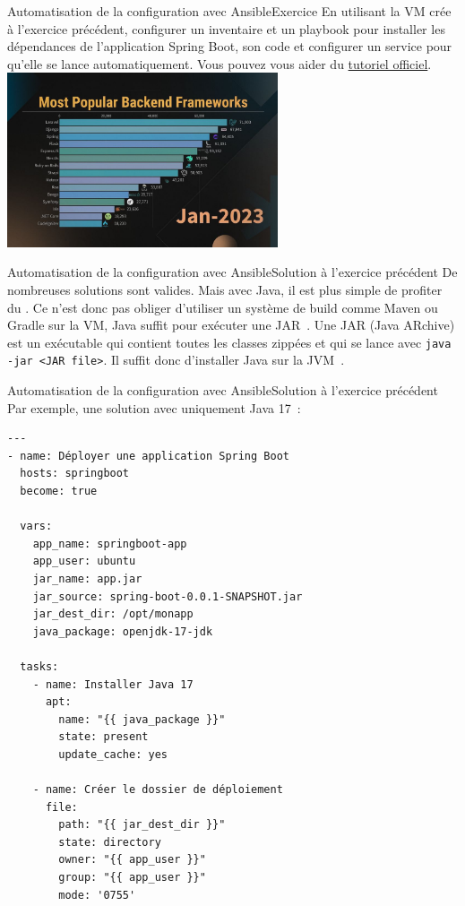 \documentclass{beamer}
\begin{document}
    \begin{frame}{Automatisation de la configuration avec Ansible}{Exercice \execcounterdispinc{}}
        En utilisant la VM crée à l'exercice précédent, configurer un inventaire et un playbook pour installer les dépendances de l'application Spring Boot, son code et configurer un service pour qu'elle se lance automatiquement.
        \bigbreak
        Vous pouvez vous aider du \href{https://spring.io/guides/gs/spring-boot}{tutoriel officiel}.
        \bigbreak
        \centering
        \includegraphics[width=8cm]{image/most-popular-backend}
    \end{frame}

    \begin{frame}{Automatisation de la configuration avec Ansible}{Solution à l'exercice précédent}
        De nombreuses solutions sont valides.
        Mais avec Java, il est plus simple de profiter du .
        \bigbreak
        Ce n'est donc pas obliger d'utiliser un système de build comme Maven ou Gradle sur la VM, Java suffit pour exécuter une JAR~.
        \bigbreak
        Une JAR (Java ARchive) est un exécutable qui contient toutes les classes zippées et qui se lance avec \lstinline{java -jar <JAR file>}.
        Il suffit donc d'installer Java sur la JVM~.
    \end{frame}

    \begin{frame}[fragile]{Automatisation de la configuration avec Ansible}{Solution à l'exercice précédent}
        Par exemple, une solution avec uniquement Java 17~:
        \begin{lstlisting}[basicstyle=\ttfamily\tiny]
---
- name: Déployer une application Spring Boot
  hosts: springboot
  become: true

  vars:
    app_name: springboot-app
    app_user: ubuntu
    jar_name: app.jar
    jar_source: spring-boot-0.0.1-SNAPSHOT.jar
    jar_dest_dir: /opt/monapp
    java_package: openjdk-17-jdk

  tasks:
    - name: Installer Java 17
      apt:
        name: "{{ java_package }}"
        state: present
        update_cache: yes

    - name: Créer le dossier de déploiement
      file:
        path: "{{ jar_dest_dir }}"
        state: directory
        owner: "{{ app_user }}"
        group: "{{ app_user }}"
        mode: '0755'
        \end{lstlisting}
    \end{frame}
\end{document}
